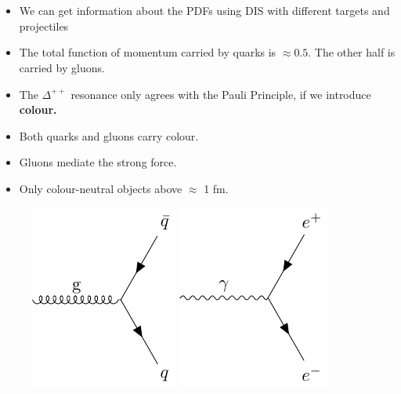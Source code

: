 \documentclass[a4paper, 11pt, normalem]{report}
\begin{document}
\chapter{}
\begin{itemize}
    \item We can get information about the PDFs using DIS with different targets and projectiles
    \item The total function of momentum carried by quarks is $\approx 0.5$. 
        The other half is carried by gluons.
    \item The $\Delta^{++}$ resonance only agrees with the Pauli Principle, if we introduce \textbf{colour.}
    \item Both quarks and gluons carry colour. 
    \item Gluons mediate the strong force. 
    \item Only colour-neutral objects above $\approx$ 1 fm.
\end{itemize}
\begin{figure}[H]
    \centering
    \includegraphics{gluon1.pdf}
    \includegraphics{gluon2.pdf}
\end{figure}
\end{document}
